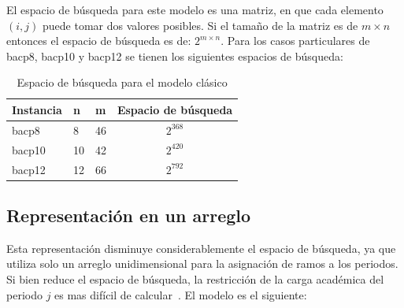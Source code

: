 \documentclass[letterpaper,10pt]{article}
\begin{document}
El espacio de búsqueda para este modelo es una matriz, en que cada elemento $(i,j)$ puede tomar dos valores posibles. Si el tamaño de la matriz es de $m \times n$ entonces el espacio de búsqueda es de: $2^{m\times n}$. Para los casos particulares de bacp8, bacp10 y bacp12 se tienen los siguientes espacios de búsqueda:

\begin{table}[H]
  \centering
  \begin{tabular}{@{}lllc@{}}
    \toprule[1pt]
    Instancia & n & m & Espacio de búsqueda\\
    \midrule
    bacp8 & 8 & 46 & $2^{368}$ \\
    bacp10 & 10 & 42 & $2^{420}$ \\
    bacp12 & 12 & 66 & $2^{792}$ \\
    \bottomrule
  \end{tabular}
  \caption{Espacio de búsqueda para el modelo clásico}
\end{table}

\subsection{Representación en un arreglo} \label{sec:reparreglo}

Esta representación disminuye considerablemente el espacio de búsqueda, ya que utiliza solo un arreglo unidimensional para la asignación de ramos a los periodos. Si bien reduce el espacio de búsqueda, la restricción de la carga académica del periodo $j$ es mas difícil de calcular~\cite{Hnich02modellinga}. El modelo es el siguiente:
\end{document}
